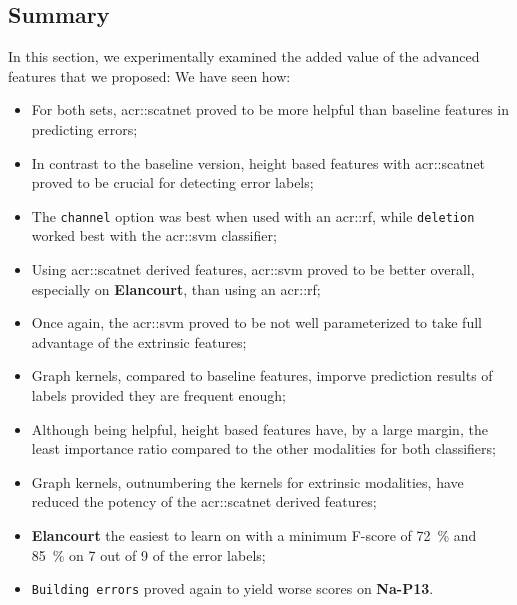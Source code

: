     \subsection{Summary}
        \label{subsec::more_experiments::richer_features::summary}
        In this section, we experimentally examined the added value of the advanced features that we proposed:
        We have seen how:
        \begin{itemize}[label=\(\blacktriangleright\)]
            \item For both sets, \gls{acr::scatnet} proved to be more helpful than baseline features in predicting errors; 
            \item In contrast to the baseline version, height based features with \gls{acr::scatnet} proved to be crucial for detecting error labels;
            \item The \texttt{channel} option was best when used with an \gls{acr::rf}, while \texttt{deletion} worked best with the \gls{acr::svm} classifier;
            \item Using \gls{acr::scatnet} derived features, \gls{acr::svm} proved to be better overall, especially on \textbf{Elancourt}, than using an \gls{acr::rf};
            \item Once again, the \gls{acr::svm} proved to be not well parameterized to take full advantage of the extrinsic features;
            \item Graph kernels, compared to baseline features, imporve prediction results of labels provided they are frequent enough;
            \item Although being helpful, height based features have, by a large margin, the least importance ratio compared to the other modalities for both classifiers;
            \item Graph kernels, outnumbering the kernels for extrinsic modalities, have reduced the potency of the \gls{acr::scatnet} derived features;
            \item \textbf{Elancourt} the easiest to learn on with a minimum F-score of \SI{72}{\percent} and \SI{85}{\percent} on 7 out of 9 of the error labels;
            \item \texttt{Building errors} proved again to yield worse scores on \textbf{Na-P13}.
        \end{itemize}

